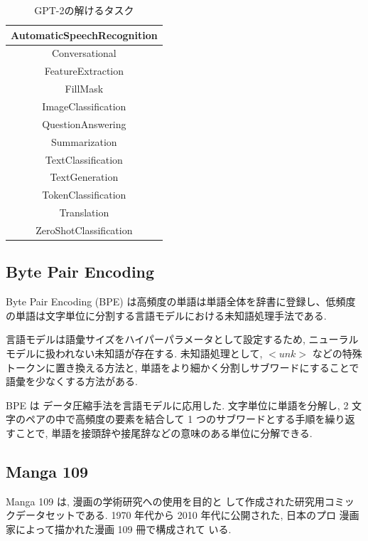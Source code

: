 \documentclass[twocolumn]{jarticle}     %
\begin{document}
\begin{table}[tbh]
  \begin{center}
    \caption{GPT-2の解けるタスク}
    \begin{tabular}{|c|} \hline
      AutomaticSpeechRecognition \\ \hline
      Conversational \\ \hline
      FeatureExtraction \\ \hline
      FillMask \\ \hline
      ImageClassification \\ \hline
      QuestionAnswering \\ \hline
      Summarization \\ \hline
      TextClassification \\ \hline
      TextGeneration \\ \hline
      TokenClassification \\ \hline
      Translation \\ \hline
      ZeroShotClassification \\ \hline
    \end{tabular}
    \label{tab:task}
  \end{center}
\end{table}

\subsection{Byte Pair Encoding}
Byte Pair Encoding (BPE) は高頻度の単語は単語全体を辞書に登録し、低頻度の単語は文字単位に分割する言語モデルにおける未知語処理手法である.

言語モデルは語彙サイズをハイパーパラメータとして設定するため, ニューラルモデルに扱われない未知語が存在する.
未知語処理として, $<unk>$ などの特殊トークンに置き換える方法と, 単語をより細かく分割しサブワードにすることで語彙を少なくする方法がある.

BPE は
データ圧縮手法を言語モデルに応用した.
文字単位に単語を分解し, 2 文字のペアの中で高頻度の要素を結合して 1 つのサブワードとする手順を繰り返すことで,
単語を接頭辞や接尾辞などの意味のある単位に分解できる.

\subsection{Manga 109}
Manga 109 \cite{mtap_matsui_2017} は, 漫画の学術研究への使用を目的と
して作成された研究用コミックデータセットである.
1970 年代から 2010 年代に公開された, 日本のプロ
漫画家によって描かれた漫画 109 冊で構成されて
いる.
\end{document}
